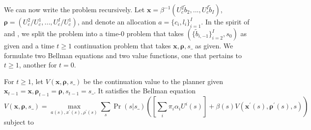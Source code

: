 \documentclass[thmsb,11pt]{article}
\begin{document}
 We can now write the problem recursively. Let $\bm{x}= \beta^{-1}\left( U_{c}^{2}\tilde{b}_{2},...,U_{c}^{I}\tilde{b}_{I}\right)$, $\bm{\rho }=\left( U_{c}^{2}/U_{c}^{1},...,U_{c}^{I}/U_{c}^{1}\right) $, and denote an allocation $a=\{c_i,l_i\}^{I}_{i=1}.$
In the spirit of \cite{Kydland1980} and \cite{Farhi2010}, we split the problem into a time-0 problem that takes $(\{\tilde{b}_{i,-1}\}^{I}_{i=2}, s_0)$ as given and   a time $t \geq 1$ continuation problem  that takes $\bm x,\bm \rho,s\_$ as given. We formulate
two Bellman equations and two value functions, one that pertains to $t\geq 1$, another for $t=0$.

\smallskip
For $t\geq1$, let $V(\bm{x},\bm{\rho },s\_)$ be the continuation value to the planner given $\bm x_{t-1}=\bm x,\bm \rho_{t-1}=\bm \rho,s_{t-1}=s\_$. It satisfies the Bellman equation
\smallskip\
\begin{equation}
V(\bm{x},\bm{\rho },s\_)=\max_{a(s),x^{\prime}(s),\rho^{\prime}(s)}{\sum_{s}\Pr {(s|s\_)\left( \left[
\sum_{i}{\pi _{i}\alpha _{i}U^{i}(s)}\right] +\beta(s) V(\bm{x}^{\prime
}(s),\bm{\rho }^{\prime }(s),s)\right) }}  \label{eq:BM2}
\end{equation}%
subject to  \label{eq:BM2_cons}
\end{document}

